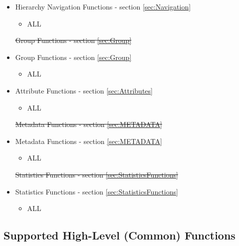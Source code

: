 \documentclass[12pt]{report} %
\providecommand{\DIFdeltex}[1]{{\protect\color{red}\sout{#1}}}                      %
\providecommand{\DIFaddbegin}{} %
\providecommand{\DIFaddend}{} %
\providecommand{\DIFdelbegin}{} %
\providecommand{\DIFdelend}{} %
\providecommand{\DIFdel}[1]{\texorpdfstring{\DIFdeltex{#1}}{}} %
\newcommand{\DIFscaledelfig}{0.5}
\newlength{\DIFdelgraphicswidth} %
\newlength{\DIFdelgraphicsheight} %
\newcommand{\DIFaddincludegraphics}[2][]{{\color{blue}\fbox{\DIFOincludegraphics[#1]{#2}}}} %
\newcommand{\DIFdelincludegraphics}[2][]{%
\sbox{\DIFdelgraphicsbox}{\DIFOincludegraphics[#1]{#2}}%
\settoboxwidth{\DIFdelgraphicswidth}{\DIFdelgraphicsbox} %
\settoboxtotalheight{\DIFdelgraphicsheight}{\DIFdelgraphicsbox} %
\scalebox{\DIFscaledelfig}{%
\parbox[b]{\DIFdelgraphicswidth}{\usebox{\DIFdelgraphicsbox}\\[-\baselineskip] \rule{\DIFdelgraphicswidth}{0em}}\llap{\resizebox{\DIFdelgraphicswidth}{\DIFdelgraphicsheight}{%
\setlength{\unitlength}{\DIFdelgraphicswidth}%
\begin{picture}(1,1)%
\thicklines\linethickness{2pt} %
{\color[rgb]{1,0,0}\put(0,0){\framebox(1,1){}}}%
{\color[rgb]{1,0,0}\put(0,0){\line( 1,1){1}}}%
{\color[rgb]{1,0,0}\put(0,1){\line(1,-1){1}}}%
\end{picture}%
}\hspace*{3pt}}} %
} %
\DeclareRobustCommand{\DIFaddbegin}{\DIFOaddbegin \let\includegraphics\DIFaddincludegraphics} %
\DeclareRobustCommand{\DIFaddend}{\DIFOaddend \let\includegraphics\DIFOincludegraphics} %
\DeclareRobustCommand{\DIFdelbegin}{\DIFOdelbegin \let\includegraphics\DIFdelincludegraphics} %
\DeclareRobustCommand{\DIFdelend}{\DIFOaddend \let\includegraphics\DIFOincludegraphics} %
\begin{document}
\begin{itemize}[noitemsep,nolistsep] 
	\item{Hierarchy Navigation Functions - section \ref{sec:Navigation}}
		\begin{itemize}[noitemsep,nolistsep] 
			\item{ALL}
		\end{itemize}
	\DIFdelbegin %
\DIFdel{Group Functions - section \ref{sec:Group}
	}\DIFdelend \DIFaddbegin \item{Group Functions - section \ref{sec:Group}}
		\DIFaddend \begin{itemize}[noitemsep,nolistsep] 
			\item{ALL}
		\end{itemize}
	\item{Attribute Functions - section \ref{sec:Attributes}}
		\begin{itemize}[noitemsep,nolistsep] 
			\item{ALL}
		\end{itemize}
	\DIFdelbegin %
\DIFdel{Metadata Functions - section \ref{sec:METADATA}
	}\DIFdelend \DIFaddbegin \item{Metadata Functions - section \ref{sec:METADATA}}
		\DIFaddend \begin{itemize}[noitemsep,nolistsep] 
			\item{ALL}
		\end{itemize}
	\DIFdelbegin %
\DIFdel{Statistics Functions - section \ref{sec:StatisticsFunctions}
	}\DIFdelend \DIFaddbegin \item{Statistics Functions - section \ref{sec:StatisticsFunctions}}
		\DIFaddend \begin{itemize}[noitemsep,nolistsep] 
			\item{ALL}
		\end{itemize}
\end{itemize}


\subsection{Supported High-Level (Common) Functions}\label{sec:RMOSHighLevel}

\end{document}

